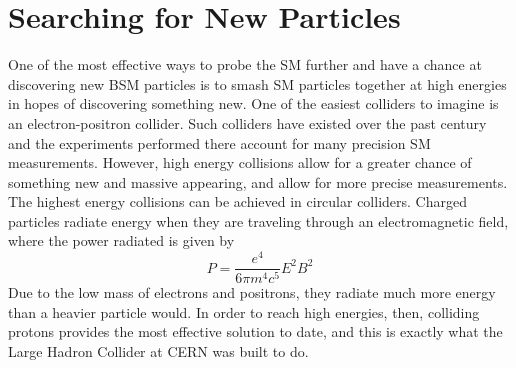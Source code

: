 \chapter{Searching for New Particles}\label{Sec:CMS}

One of the most effective ways to probe the SM further and have a chance at discovering new BSM particles is to smash SM particles together at high energies in hopes of discovering something new. One of the easiest colliders to imagine is an electron-positron collider. Such colliders have existed over the past century and the experiments performed there account for many precision SM measurements. However, high energy collisions allow for a greater chance of something new and massive appearing, and allow for more precise measurements. The highest energy collisions can be achieved in circular colliders. Charged particles radiate energy when they are traveling through an electromagnetic field, where the power radiated is given by
\begin{equation}\label{Eq:SynchRad}
   P = \frac{e^4}{6\pi m^4c^5}E^2B^2
\end{equation}
Due to the low mass of electrons and positrons, they radiate much more energy than a heavier particle would. In order to reach high energies, then, colliding protons provides the most effective solution to date, and this is exactly what the Large Hadron Collider at CERN was built to do. 
\vspace{5mm}



